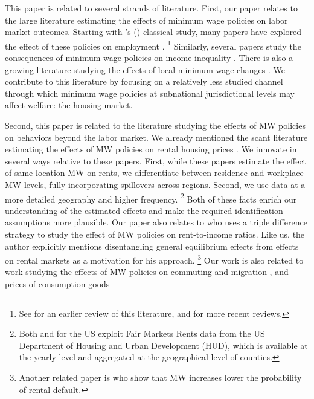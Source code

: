 This paper is related to several strands of literature.
First, our paper relates to the large literature estimating the effects of 
minimum wage policies on labor market outcomes.
Starting with \citeauthor{CardKrueger1994}'s (\citeyear{CardKrueger1994}) 
classical study, many papers have explored the effect of these policies on 
employment \parencite[some recent examples include][]{MeerWest2016,
CegnizEtAl2019}.%
\footnote{See \textcite{Neumark2006} for an earlier review of this literature, 
and \textcite{Dube2019, NeumarkShirley2021} for more recent reviews.}
Similarly, several papers study the consequences of minimum wage policies on 
income inequality \parencite{Lee1999, AutorEtAl2016}.
There is also a growing literature studying the effects of local minimum wage 
changes \parencite{DubeLindner2021}.
We contribute to this literature by focusing on a relatively less studied 
channel through which minimum wage policies at subnational jurisdictional 
levels may affect welfare: the housing market.

Second, this paper is related to the literature studying the effects of MW 
policies on behaviors beyond the labor market.
We already mentioned the scant literature estimating the effects of MW policies
on rental housing prices \parencite{Tidemann2018, Yamagishi2021}.
We innovate in several ways relative to these papers.
First, while these papers estimate the effect of same-location MW on rents, we 
differentiate between residence and workplace MW levels, fully incorporating
spillovers across regions.
Second, we use data at a more detailed geography and higher frequency.%
\footnote{Both \textcite{Tidemann2018} and \textcite{Yamagishi2019} for the US 
exploit Fair Markets Rents data from the US Department of Housing and Urban 
Development (HUD), which is available at the yearly level and aggregated at the 
geographical level of counties.}
Both of these facts enrich our understanding of the estimated effects and make 
the required identification assumptions more plausible.
Our paper also relates to \textcite{Hughes2020} who uses a triple difference 
strategy to study the effect of MW policies on rent-to-income ratios. Like us, 
the author explicitly mentions disentangling general equilibrium effects from 
effects on rental markets as a motivation for his approach.%
\footnote{Another related paper is \textcite{AgarwalEtAl2021} who show that MW 
increases lower the probability of rental default.}
Our work is also related to work studying the effects of MW policies on 
commuting and migration \parencite{Cadena2014, Monras2019, PerezPerez2021}, and 
prices of consumption goods \parencite{AllegrettoReich2018, Leung2021}

